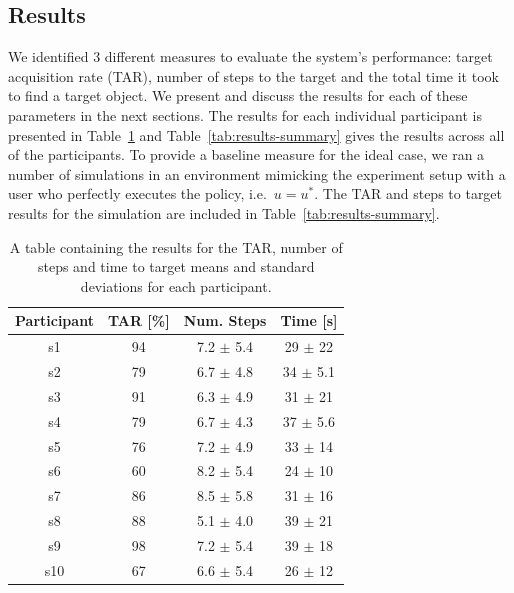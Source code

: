 \documentclass[a4paper, twoside]{article}
\begin{document}
\subsection{Results}

\noindent We identified 3 different measures to evaluate the system's performance: target acquisition rate (TAR), number of steps to the target and the total time it took to find a target object. We present and discuss the results for each of these parameters in the next sections. The results for each individual participant is presented in Table~\ref{tab:results-full} and Table~\ref{tab:results-summary} gives the results across all of the participants. To provide a baseline measure for the ideal case, we ran a number of simulations in an environment mimicking the experiment setup with a user who perfectly executes the policy, i.e.\ $u=u^*$. The TAR and steps to target results for the simulation are included in Table~\ref{tab:results-summary}.

\begin{table}
  \centering
  \caption{A table containing the results for the TAR, number of steps and time to target means and standard deviations for each participant. }\label{tab:results-full}
  \begin{tabular}{cccc}
    \toprule
    Participant & TAR [\%] & Num. Steps & Time [s] \\ \midrule
    s1 & 94 & 7.2 $\pm$ 5.4 & 29 $\pm$ 22 \\ \midrule
    s2 & 79 & 6.7 $\pm$ 4.8 & 34 $\pm$ 5.1 \\ \midrule
    s3 & 91 & 6.3 $\pm$ 4.9 & 31 $\pm$ 21 \\ \midrule
    s4 & 79 & 6.7 $\pm$ 4.3 & 37 $\pm$ 5.6 \\ \midrule
    s5 & 76 & 7.2 $\pm$ 4.9 & 33 $\pm$ 14 \\ \midrule
    s6 & 60 & 8.2 $\pm$ 5.4 & 24 $\pm$ 10 \\ \midrule
    s7 & 86 & 8.5 $\pm$ 5.8 & 31 $\pm$ 16 \\ \midrule
    s8 & 88 & 5.1 $\pm$ 4.0 & 39 $\pm$ 21 \\ \midrule
    s9 & 98 & 7.2 $\pm$ 5.4 & 39 $\pm$ 18 \\ \midrule
    s10 & 67 & 6.6 $\pm$ 5.4 & 26 $\pm$ 12 \\ \midrule
    \bottomrule                    
  \end{tabular}                    
\end{table}                        
                                   
\end{document}
